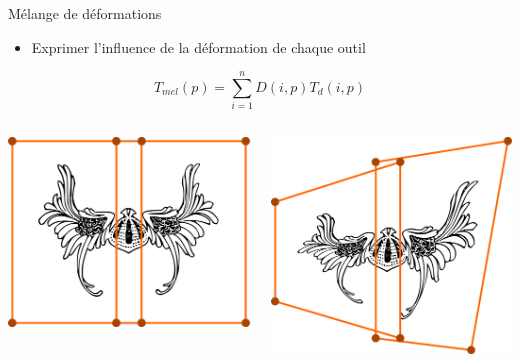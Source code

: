 \documentclass[xcolor=x11names,compress]{beamer}
\renewcommand{\(}{\begin{columns}} \renewcommand{\)}{\end{columns}}
\newcommand{\<}[1]{\begin{column}{#1}} \renewcommand{\>}{\end{column}}
\begin{document}

\begin{frame}{Mélange de déformations}
  \begin{itemize}
    \item Exprimer l'influence de la déformation de chaque outil
  \end{itemize}
  \begin{displaymath}
    T_{mel}(p) = \sum_{i=1}^n D(i, p) T_{d}(i, p)
  \end{displaymath}
  \begin{columns}[t]
    \begin{column}{0.5\textwidth}
      \centering
      \includegraphics[scale=0.13]{Deformation-Viking-Avant}
    \end{column}
    \begin{column}{0.5\textwidth}
      \centering
      \includegraphics[scale=0.13]{Deformation-Viking-Apres}

\end{column}
\end{columns}
\end{frame}
\end{document}

